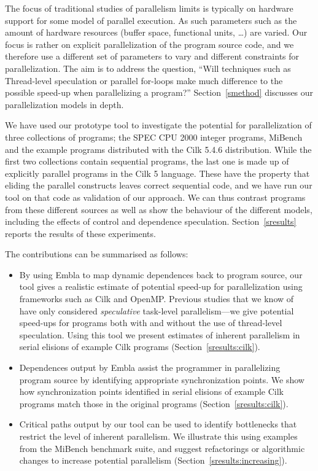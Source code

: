 The focus of traditional studies of parallelism limits \cite{wall91limits,warg01limits}
is typically on hardware support for some model of parallel
execution. As such parameters
such as the amount of hardware resources (buffer space, functional
units, \ldots) are varied. Our focus is rather on explicit
parallelization of the program source code, and we therefore use a
different set of parameters to vary and different constraints for
parallelization. The aim is to address the question,
``Will techniques such as
Thread-level speculation or parallel for-loops make much
difference to the possible speed-up when parallelizing
a program?'' Section~\ref{smethod} 
discusses our parallelization models in depth.

We have used our prototype tool to investigate the potential for 
parallelization of three collections of programs; the SPEC CPU 2000 
integer programs, MiBench and the example programs distributed with
the Cilk 5.4.6 distribution. While the first two collections contain
sequential programs, the last one is made up of explicitly parallel 
programs in the Cilk 5 language. These have the property that eliding
the parallel constructs leaves correct sequential code, and we have run 
our tool on that code as validation of our approach. We can thus contrast 
programs from these different sources as well as show the behaviour of 
the different models, including the effects of control and dependence speculation.
Section~\ref{sresults} reports the results of these experiments.

The contributions can be summarised as follows:
\begin{itemize}
\item
By using Embla to map dynamic dependences back to program source,
our tool gives a realistic estimate of potential speed-up for
parallelization using frameworks such as Cilk and OpenMP.
Previous studies that we know of~\cite{Kreaseck00limitsof,warg01limits, oplinger99insearch}
have only considered \emph{speculative}
task-level parallelism---we give potential speed-ups for programs
both with and without the use of thread-level speculation.
Using this tool we present estimates of inherent parallelism in
serial elisions of example Cilk programs (Section~\ref{sresults:cilk}).
\item
Dependences output by Embla assist the programmer in 
parallelizing program source by identifying
appropriate synchronization points. We show how synchronization
points identified in serial elisions of example Cilk programs
match those in the original programs (Section~\ref{sresults:cilk}).
\item
Critical paths output by our tool can
be used to identify bottlenecks that restrict the level of
inherent parallelism. We illustrate this using examples
from the MiBench benchmark suite, and suggest refactorings
or algorithmic changes to increase potential parallelism (Section~\ref{sresults:increasing}).
\end{itemize}
